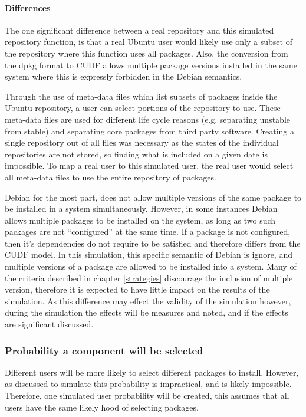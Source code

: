 \paragraph{Differences}
The one significant difference between a real repository and this simulated repository function,
is that a real Ubuntu user would likely use only a subset of the repository where this function uses all packages. 
Also, the conversion from the dpkg format to CUDF allows multiple package versions installed in the same system where this is expressly forbidden in the Debian semantics. 

Through the use of meta-data files which list subsets of packages inside the Ubuntu repository, a user can select portions of the repository to use.
These meta-data files are used for different life cycle reasons (e.g. separating unstable from stable) and separating core packages from third party software.
Creating a single repository out of all files was necessary as the states of the individual repositories are not stored,
so finding what is included on a given date is impossible.
To map a real user to this simulated user, the real user would select all meta-data files to use the entire repository of packages. 

Debian for the most part, does not allow multiple versions of the same package to be installed in a system simultaneously.
However, in some instances Debian allows multiple packages to be installed on the system, as long as two such packages are not ``configured'' at the same time.
If a package is not configured, then it's dependencies do not require to be satisfied and therefore differs from the CUDF model.
In this simulation, this specific semantic of Debian is ignore, and multiple versions of a package are allowed to be installed into a system.
Many of the criteria described in chapter \ref{strategies} discourage the inclusion of multiple version,
therefore it is expected to have little impact on the results of the simulation.
As this difference may effect the validity of the simulation however, during the simulation the effects will be measures and noted, and if the effects are significant discussed.


\subsubsection{Probability a component will be selected}
Different users will be more likely to select different packages to install.
However, as discussed to simulate this probability is impractical, and is likely impossible.
Therefore, one simulated user probability will be created, this assumes that all users have the same likely hood of selecting packages.

